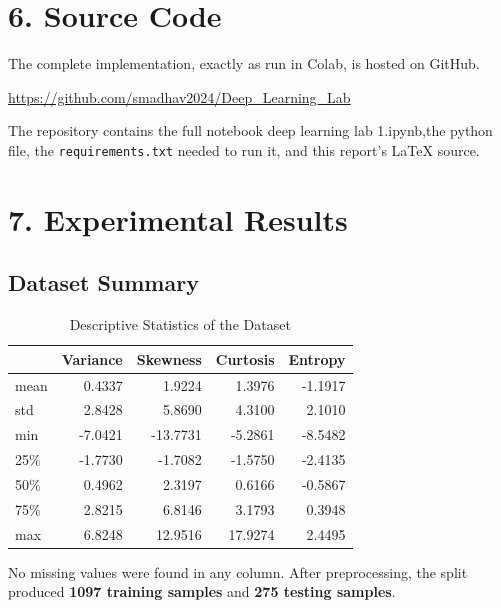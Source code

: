 \documentclass[11pt]{article}
\begin{document}

\section*{6. Source Code}

The complete implementation, exactly as run in Colab, is hosted on GitHub.

\begin{center}
\url{https://github.com/smadhav2024/Deep_Learning_Lab}
\end{center}

The repository contains the full notebook deep learning lab 1.ipynb,the python file, the \texttt{requirements.txt} needed to run it, and this report's LaTeX source.


\section*{7. Experimental Results}

\subsection*{Dataset Summary}

\begin{table}[H]
\centering
\caption{Descriptive Statistics of the Dataset}
\begin{tabular}{lrrrr}
\toprule
 & Variance & Skewness & Curtosis & Entropy \\
\midrule
mean & 0.4337 & 1.9224 & 1.3976 & -1.1917 \\
std  & 2.8428 & 5.8690 & 4.3100 & 2.1010 \\
min  & -7.0421 & -13.7731 & -5.2861 & -8.5482 \\
25\% & -1.7730 & -1.7082 & -1.5750 & -2.4135 \\
50\% & 0.4962 & 2.3197 & 0.6166 & -0.5867 \\
75\% & 2.8215 & 6.8146 & 3.1793 & 0.3948 \\
max  & 6.8248 & 12.9516 & 17.9274 & 2.4495 \\
\bottomrule
\end{tabular}
\end{table}

No missing values were found in any column. After preprocessing, the split produced \textbf{1097 training samples} and \textbf{275 testing samples}.
\end{document}
